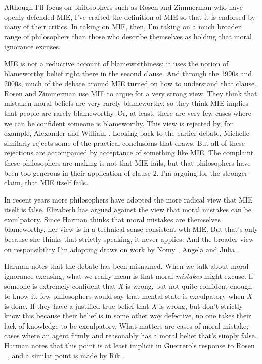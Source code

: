 Although I'll focus on philosophers such as Rosen and Zimmerman who have openly defended MIE, I've crafted the definition of MIE so that it is endorsed by many of their critics. In taking on MIE, then, I'm taking on a much broader range of philosophers than those who describe themselves as holding that moral ignorance excuses.

MIE is not a reductive account of blameworthiness; it uses the notion of blameworthy belief right there in the second clause. And through the 1990s and 2000s, much of the debate around MIE turned on how to understand that clause. Rosen and Zimmerman use MIE to argue for a very strong view. They think that mistaken moral beliefs are very rarely blameworthy, so they think MIE implies that people are rarely blameworthy. Or, at least, there are very few cases where we can be confident someone is blameworthy. This view is rejected by, for example, \gls{Alex}ander \citet{Guerrero2007} and William \citet{Fitzpatrick2008}. Looking back to the earlier debate, Michelle \citet{MoodyAdams1994} similarly rejects some of the practical conclusions that \citet{Calhoun1989} draws. But all of these rejections are accompanied by acceptance of something like MIE. The complaint these philosophers are making is not that MIE fails, but that philosophers have been too generous in their application of clause 2. I'm arguing for the stronger claim, that MIE itself fails.

In recent years more philosophers have adopted the more radical view that MIE itself is false. Elizabeth \citet{Harman2011a, Harman2014} has argued against the view that moral mistakes can be exculpatory. Since Harman thinks that moral mistakes are themselves blameworthy, her view is in a technical sense consistent wth MIE. But that's only because she thinks that strictly speaking, it never applies. And the broader view on responsibility I'm adopting draws on work by Nomy \citet{Arpaly2003}, Angela \citet{AngelaSmith2005} and Julia \citet{Markovits2010}.

Harman notes that the debate has been misnamed. When we talk about moral ignorance excusing, what we really mean is that moral \emph{mistakes} might excuse. If someone is extremely confident that \emph{X} is wrong, but not quite confident enough to know it, few philosophers would say that mental state is exculpatory when \emph{X} is done. If they have a justified true belief that \emph{X} is wrong, but don't strictly know this because their belief is in some other way defective, no one takes their lack of knowledge to be exculpatory. What matters are cases of moral mistake; cases where an agent firmly and reasonably has a moral belief that's simply false. Harman notes that this point is at least implicit in Guerrero's response to Rosen ~\citep{Guerrero2007}, and a similar point is made by Rik \citet{Peels2010}.

